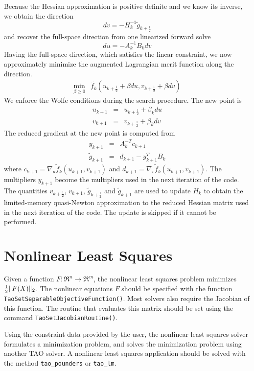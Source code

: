 Because the Hessian approximation is positive definite and we know its
inverse, we obtain the direction
\[
  dv = -H_k^{-1} \tilde{g}_{k+\frac{1}{2}}
\]
and recover the full-space direction from one linearized forward solve
\[
  du = -A_k^{-1} B_k dv
\]
Having the full-space direction, which satisfies the linear constraint, 
we now approximately minimize the augmented Lagrangian merit function 
along the direction.
\[
\begin{array}{lcl}
\displaystyle \min_{\beta \geq 0} & \tilde{f_k}(u_{k+\frac{1}{2}} + \beta du, v_{k+\frac{1}{2}} + \beta dv)
\end{array}
\]
We enforce the Wolfe conditions during the search procedure.  The new point
is
\[
\begin{array}{lcl}
u_{k+1} & = & u_{k+\frac{1}{2}} + \beta_k du \\
v_{k+1} & = & v_{k+\frac{1}{2}} + \beta_k dv
\end{array}
\]
The reduced gradient at the new point is computed from
\[
\begin{array}{lcl}
y_{k+1} & = & A_k^{-T}c_{k+1} \\
\tilde{g}_{k+1} & = & d_{k+1} - y_{k+1}^T B_k
\end{array}
\]
where $c_{k+1} = \nabla_u \tilde{f}_k (u_{k+1},v_{k+1})$ and
$d_{k+1} = \nabla_v \tilde{f}_k (u_{k+1},v_{k+1})$.  The
multipliers $y_{k+1}$ become the multipliers used in the
next iteration of the code.  The quantities $v_{k+\frac{1}{2}}$,
$v_{k+1}$, $\tilde{g}_{k+\frac{1}{2}}$ and $\tilde{g}_{k+1}$ are
used to update $H_k$ to obtain the limited-memory quasi-Newton
approximation to the reduced Hessian matrix used in the next
iteration of the code.  The update is skipped if it cannot be
performed.

\section{Nonlinear Least Squares}
\label{sec:leastsquares}
Given a function $F  : \Re^n \to \Re^m$, the nonlinear least
squares problem minimizes ${\textstyle{\frac{1}{2}}} \| F(X) \|_2$.
The nonlinear equations $F$ should be specified with the function
{\tt TaoSetSeparableObjectiveFunction()}.
Most solvers also require the Jacobian of this function.  
The routine that evaluates this matrix should be set
using the command {\tt TaoSetJacobianRoutine()}.

Using the constraint data provided by the user, the nonlinear
least squares solver formulates a minimization problem, and
solves the minimization problem using another TAO solver.  
A nonlinear least squares application should be solved with
the method \texttt{tao\_pounders} or \texttt{tao\_lm}.


